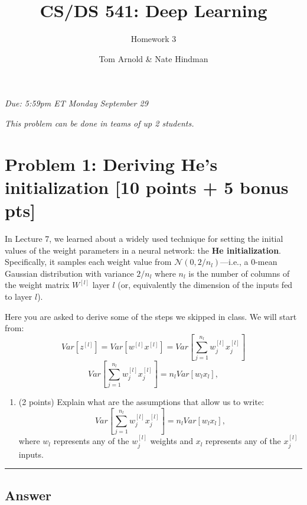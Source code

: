 \documentclass[
  letterpaper,
  DIV=11,
  numbers=noendperiod]{scrartcl}
\title{CS/DS 541: Deep Learning}
\subtitle{Homework 3}
\author{Tom Arnold \& Nate Hindman}
\date{}
\providecommand{\tightlist}{%
  \setlength{\itemsep}{0pt}\setlength{\parskip}{0pt}}\usepackage{longtable,booktabs,array}
\begin{document}
\maketitle



\emph{Due: 5:59pm ET Monday September 29}

\emph{This problem can be done in teams of up 2 students.}

\section{Problem 1: Deriving He's initialization {[}10 points + 5 bonus
pts{]}}\label{problem-1-deriving-hes-initialization-10-points-5-bonus-pts}

In Lecture 7, we learned about a widely used technique for setting the
initial values of the weight parameters in a neural network: the
\textbf{He initialization}. Specifically, it samples each weight value
from \(\mathcal{N}(0,2/n_{l})\)---i.e., a 0-mean Gaussian distribution
with variance \(2/n_{l}\) where \(n_{l}\) is the number of columns of
the weight matrix \(W^{[l]}\) layer \(l\) (or, equivalently the
dimension of the inputs fed to layer \(l\)).

Here you are asked to derive some of the steps we skipped in class. We
will start from:
\[Var[z^{[l]}]=Var[w^{[l]}x^{[l]}]=Var[\sum_{j=1}^{n_{l}}w_{j}^{[l]}x_{j}^{[l]}]\]
\[Var[\sum_{j=1}^{n_{l}}w_{j}^{[l]}x_{j}^{[l]}]=n_{l}Var[w_{l}x_{l}],\]

\begin{enumerate}
\def\labelenumi{\arabic{enumi}.}
\tightlist
\item
  (2 points) Explain what are the assumptions that allow us to write:
  \[Var[\sum_{j=1}^{n_{l}}w_{j}^{[l]}x_{j}^{[l]}]=n_{l}Var[w_{l}x_{l}],\]
  where \(w_{l}\) represents any of the \(w_{j}^{[l]}\) weights and
  \(x_{l}\) represents any of the \(x_{j}^{[l]}\) inputs.
\end{enumerate}

\begin{center}\rule{0.5\linewidth}{0.5pt}\end{center}

\subsection{Answer}\label{answer}
\end{document}

